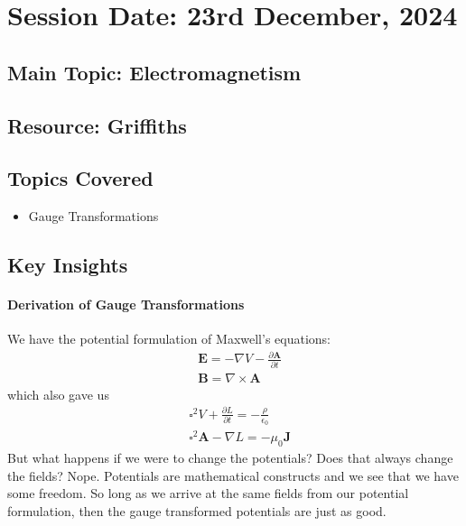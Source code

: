 \section{Session Date: 23rd December, 2024}
\subsection*{Main Topic: Electromagnetism}
\subsection*{Resource: Griffiths}
\subsection*{Topics Covered}
\begin{itemize}
    \item Gauge Transformations
\end{itemize}

\subsection*{Key Insights}
\paragraph{Derivation of Gauge Transformations}
We have the potential formulation of Maxwell's equations:
\begin{align*}
    &\mathbf{E} = - \nabla V - \frac{\partial \mathbf{A}}{\partial t} \\
    &\mathbf{B} = \nabla \times \mathbf{A}
\end{align*}
which also gave us \begin{align*}
    &\square ^{2} V + \frac{\partial L}{\partial t} =  -\frac{\rho}{\epsilon _0}\\
    &\square ^{2} \mathbf{A} - \nabla L = -\mu _0 \mathbf{J}
\end{align*}
But what happens if we were to change the potentials? Does that always change the fields? Nope. Potentials are mathematical constructs and we see that we have some freedom. So long as we arrive at the same fields from our potential formulation, then the gauge transformed potentials are just as good. 

